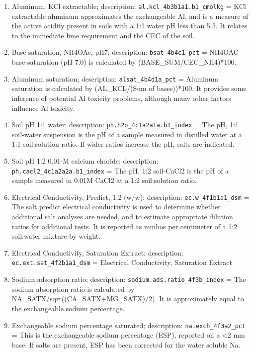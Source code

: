 \documentclass[
  graybox,natbib,nospthms]{svmono}
\begin{document}
\begin{enumerate}
\item
  Aluminum, KCl extractable; description: \texttt{al.kcl\_4b3b1a1.b1\_cmolkg} = KCl extractable aluminum approximates the exchangeable Al, and is a measure of the active acidity present in soils with a 1:1 water pH less than 5.5. It relates to the immediate lime requirement and the CEC of the soil.\\
\item
  Base saturation, NH4OAc, pH7; description: \texttt{bsat\_4b4c1\_pct} = NH4OAC base saturation (pH 7.0) is calculated by (BASE\_SUM/CEC\_NH4)*100.\\
\item
  Aluminum saturation; description: \texttt{alsat\_4b4d1a\_pct} = Aluminum saturation is calculated by (AL\_KCL/(Sum of bases))*100. It provides some inference of potential Al toxicity problems, although many other factors influence Al toxicity.\\
\item
  Soil pH 1:1 water; description: \texttt{ph.h2o\_4c1a2a1a.b1\_index} = The pH, 1:1 soil-water suspension is the pH of a sample measured in distilled water at a 1:1 soil:solution ratio. If wider ratios increase the pH, salts are indicated.\\
\item
  Soil pH 1:2 0.01-M calcium choride; description: \texttt{ph.cacl2\_4c1a2a2a.b1\_index} = The pH, 1:2 soil-CaCl2 is the pH of a sample measured in 0.01M CaCl2 at a 1:2 soil:solution ratio.\\
\item
  Electrical Conductivity, Predict, 1:2 (w/w); description: \texttt{ec.w\_4f1b1a1\_dsm} = The salt predict electrical conductivity is used to determine whether additional salt analyses are needed, and to estimate appropriate dilution ratios for additional tests. It is reported as mmhos per centimeter of a 1:2 soil:water mixture by weight.\\
\item
  Electrical Conductivity, Saturation Extract; description: \texttt{ec.ext.sat\_4f2b1a1\_dsm} = Electrical Conductivity, Saturation Extract
\item
  Sodium adsorption ratio; description: \texttt{sodium.ads.ratio\_4f3b\_index} = The sodium absorption ratio is calculated by NA\_SATX/sqrt((CA\_SATX+MG\_SATX)/2). It is approximately equal to the exchangeable sodium percentage.\\
\item
  Exchangeable sodium percentage saturated; description: \texttt{na.exch\_4f3a2\_pct} = This is the exchangeable sodium percentage (ESP), reported on a \textless2 mm base. If salts are present, ESP has been corrected for the water soluble Na.\\

\end{enumerate}
\end{document}
